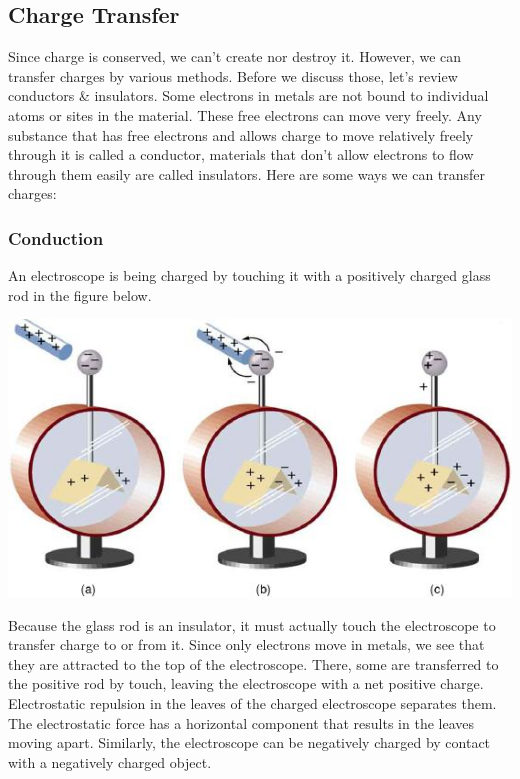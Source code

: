 \documentclass[9pt]{exam}
\begin{document}
	\subsection*{Charge Transfer} 
	Since charge is conserved, we can't create nor destroy it. However, we can transfer charges by various methods. Before we discuss those, let's review conductors \& insulators.  Some electrons in metals are not bound to individual atoms or sites in the material. These free electrons can move very freely. Any substance that has free electrons and allows charge to move relatively freely through it is called a conductor, materials that don't allow electrons to flow through them easily are called insulators. Here are some ways we can transfer charges:
	\subsubsection*{Conduction}
	An electroscope is being charged by touching it with a positively charged glass rod in the figure below.
	\begin{center}
		\includegraphics[scale=0.3]{electroscope}
	\end{center} Because the glass rod is an insulator, it must actually touch the electroscope to transfer charge to or from it. Since only electrons move in metals, we see that they are attracted to the top of the electroscope. There, some are transferred to the positive rod by touch, leaving the electroscope with a net positive charge. Electrostatic repulsion in the leaves of the charged electroscope separates them. The electrostatic force has a horizontal component that results in the leaves moving apart. Similarly, the electroscope can be negatively charged by contact with a negatively charged object.
\end{document}
